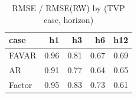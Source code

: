 \begin{table}[ht]
\centering
\begin{tabular}{lrrrr}
  \hline
case & h1 & h3 & h6 & h12 \\ 
  \hline
FAVAR & 0.96 & 0.81 & 0.67 & 0.69 \\ 
  AR & 0.91 & 0.77 & 0.64 & 0.65 \\ 
  Factor & 0.95 & 0.83 & 0.73 & 0.61 \\ 
   \hline
\end{tabular}
\caption{RMSE / RMSE(RW) by (TVP case, horizon)} 
\label{tab:tvps_rmse_wide}
\end{table}

